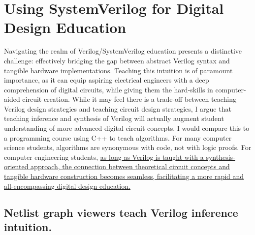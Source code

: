 
\chapter{Using SystemVerilog for Digital Design Education}
\label{chapter:digital_design}

Navigating the realm of Verilog/SystemVerilog education presents a distinctive challenge: effectively bridging the gap between abstract Verilog syntax and tangible hardware implementations.
Teaching this intuition is of paramount importance, as it can equip aspiring electrical engineers with a deep comprehension of digital circuits, while giving them the hard-skills in computer-aided circuit creation.
While it may feel there is a trade-off between teaching Verilog design strategies and teaching circuit design strategies, I argue that teaching inference and synthesis of Verilog will actually augment student understanding of more advanced digital circuit concepts.
I would compare this to a programming course using C++ to teach algorithms.
For many computer science students, algorithms are synonymous with code, not with logic proofs.
For computer engineering students, \ul{as long as Verilog is taught with a synthesis-oriented approach, the connection between theoretical circuit concepts and tangible hardware construction becomes seamless, facilitating a more rapid and all-encompassing digital design education.}

\section{Netlist graph viewers teach Verilog inference intuition.}



